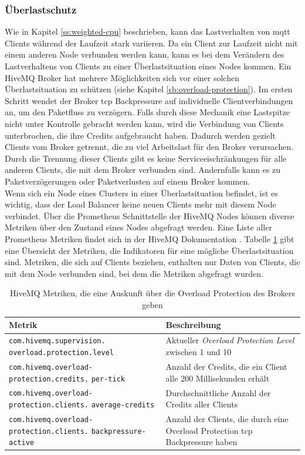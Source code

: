 \subsubsection{Überlastschutz} \label{ss:circuit-breaking}
Wie in Kapitel \ref{ss:weighted-cpu} beschrieben, kann das Lastverhalten von \ac{mqtt} Clients während der Laufzeit stark variieren. Da ein Client zur Laufzeit nicht mit einem anderen Node verbunden werden kann, kann es bei dem Verändern des Lastverhaltens von Clients zu einer Überlastsituation eines Nodes kommen.
Ein HiveMQ Broker hat mehrere Möglichkeiten sich vor einer solchen Überlastsituation zu schützen (siehe Kapitel \ref{sb:overload-protection}).
Im ersten Schritt wendet der Broker \ac{tcp} Backpressure auf individuelle Clientverbindungen an, um den Paketfluss zu verzögern.
Falls durch diese Mechanik eine Lastspitze nicht unter Kontrolle gebracht werden kann, wird die Verbindung von Clients unterbrochen, die ihre Credits aufgebraucht haben.
Dadurch werden gezielt Clients vom Broker getrennt, die zu viel Arbeitslast für den Broker verursachen.
Durch die Trennung dieser Clients gibt es keine Serviceeischränkungen für alle anderen Clients, die mit dem Broker verbunden sind. Andernfalls kann es zu Paketverzögerungen oder Paketverlusten auf einem Broker kommen.
\\
Wenn sich ein Node eines Clusters in einer Überlastsituation befindet, ist es wichtig, dass der Load Balancer keine neuen Clients mehr mit diesem Node verbindet.
Über die Prometheus Schnittstelle der HiveMQ Nodes können diverse Metriken über den Zustand eines Nodes abgefragt werden.
Eine Liste aller Prometheus Metriken findet sich in der HiveMQ Dokumentation \cite{MonitoringHiveMQDocumentation}.
Tabelle \ref{table:overload-protection-metrics} gibt eine Übersicht der Metriken, die Indikatoren für eine mögliche Überlastsituation sind. Metriken, die sich auf Clients beziehen, enthalten nur Daten von Clients, die mit dem Node verbunden sind, bei dem die Metriken abgefragt wurden.
\begin{table}[htbp]
\centering
\renewcommand{\arraystretch}{1.5}
\begin{tabularx}{\textwidth}{|p{5cm}|X|}
    \hline
    \textbf{Metrik} & \textbf{Beschreibung} \\
    \hline
    \hline
    \verb|com.hivemq.supervision.| \verb|overload.protection.level| & Aktueller \textit{Overload Protection Level} zwischen 1 und 10 \\
    \hline
    \verb|com.hivemq.overload-| \verb|protection.credits.| \verb|per-tick| & Anzahl der Credits, die ein Client alle 200 Millisekunden erhält \\
    \hline
    \verb|com.hivemq.overload-| \verb|protection.clients.| \verb|average-credits| & Durchschnittliche Anzahl der Credits aller Clients \\
    \hline
    \verb|com.hivemq.overload-| \verb|protection.clients.| \verb|backpressure-active| & Anzahl der Clients, die durch eine Overload Protection \ac{tcp} Backpressure haben \\
    \hline
\end{tabularx}
\caption{HiveMQ Metriken, die eine Auskunft über die Overload Protection des Brokers geben}
\label{table:overload-protection-metrics}
\end{table}
